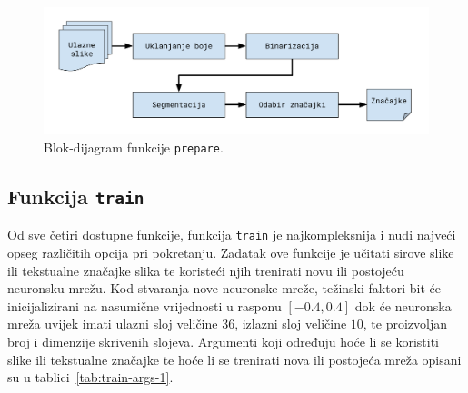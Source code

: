 \begin{figure}[htb]
    \centering
    \includegraphics[width=12cm]{images/chapter4/prepare-diagram.pdf}
    \caption{Blok-dijagram funkcije \texttt{prepare}.}
    \label{fig:prepare-diagram}
\end{figure}

\subsection{Funkcija \texttt{train}}
\label{subsec:funkcija-train}
Od sve četiri dostupne funkcije, funkcija \texttt{train} je najkompleksnija i nudi najveći opseg različitih opcija pri
pokretanju. Zadatak ove funkcije je učitati sirove slike ili tekstualne značajke slika te koristeći njih trenirati
novu ili postojeću neuronsku mrežu. Kod stvaranja nove neuronske mreže, težinski faktori bit će inicijalizirani na
nasumične vrijednosti u rasponu $[-0.4, 0.4]$ dok će neuronska mreža uvijek imati ulazni sloj veličine $36$, izlazni
sloj veličine $10$, te proizvoljan broj i dimenzije skrivenih slojeva. Argumenti koji određuju hoće li se koristiti
slike ili tekstualne značajke te hoće li se trenirati nova ili postojeća mreža opisani su u
tablici\ \ref{tab:train-args-1}.
